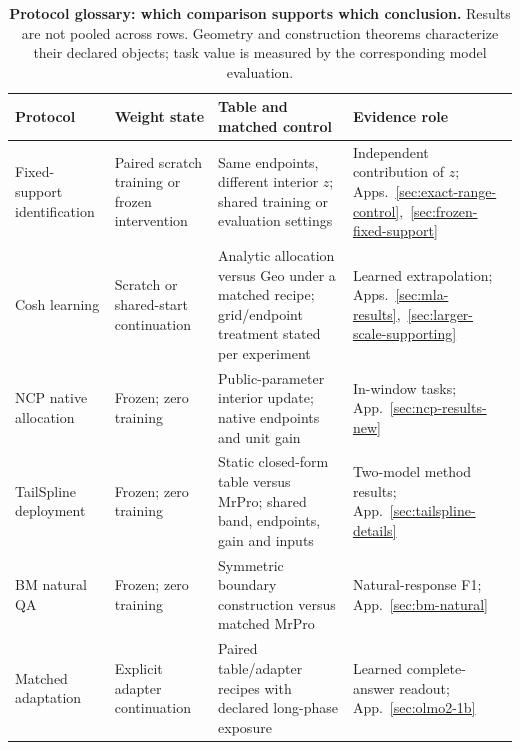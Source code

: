 \begin{table}[!ht]
\centering\small
\setlength{\tabcolsep}{4pt}
\caption{\textbf{Protocol glossary: which comparison supports which conclusion.} Results are not pooled across rows. Geometry and construction theorems characterize their declared objects; task value is measured by the corresponding model evaluation.}
\label{tab:protocol-glossary}\label{tab:evidence-map}
\begin{tabular}{@{}>{\raggedright\arraybackslash}p{.18\linewidth}>{\raggedright\arraybackslash}p{.21\linewidth}>{\raggedright\arraybackslash}p{.32\linewidth}>{\raggedright\arraybackslash}p{.22\linewidth}@{}}
\toprule
Protocol & Weight state & Table and matched control & Evidence role \\
\midrule
Fixed-support identification & Paired scratch training or frozen intervention & Same endpoints, different interior $z$; shared training or evaluation settings & Independent contribution of $z$; Apps.~\ref{sec:exact-range-control},~\ref{sec:frozen-fixed-support} \\
Cosh learning & Scratch or shared-start continuation & Analytic allocation versus Geo under a matched recipe; grid/endpoint treatment stated per experiment & Learned extrapolation; Apps.~\ref{sec:mla-results},~\ref{sec:larger-scale-supporting} \\
NCP native allocation & Frozen; zero training & Public-parameter interior update; native endpoints and unit gain & In-window tasks; App.~\ref{sec:ncp-results-new} \\
TailSpline deployment & Frozen; zero training & Static closed-form table versus MrPro; shared band, endpoints, gain and inputs & Two-model method results; App.~\ref{sec:tailspline-details} \\
BM natural QA & Frozen; zero training & Symmetric boundary construction versus matched MrPro & Natural-response F1; App.~\ref{sec:bm-natural} \\
Matched adaptation & Explicit adapter continuation & Paired table/adapter recipes with declared long-phase exposure & Learned complete-answer readout; App.~\ref{sec:olmo2-1b} \\
\bottomrule
\end{tabular}
\end{table}
\FloatBarrier
